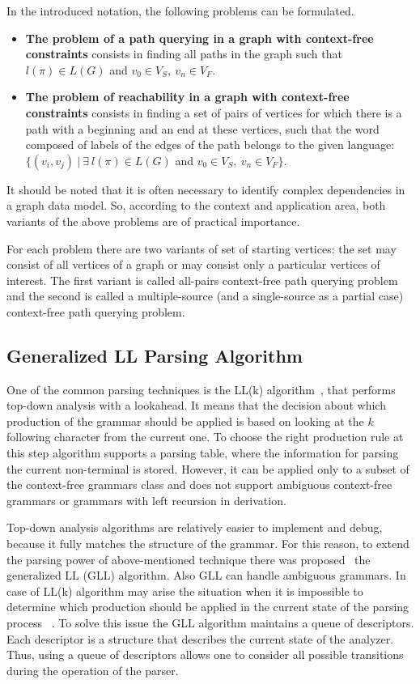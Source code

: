 In the introduced notation, the following problems can be formulated.

\begin{itemize}
     \item \textbf{The problem of a path querying in a graph with context-free constraints} consists in finding all paths in the graph such that $l(\pi) \in L (G)$ and $v_0 \in V_S, ~v_n \in V_F$.
    
     \item \textbf{The problem of reachability in a graph with context-free constraints} consists in finding a set of pairs of vertices for which there is a path with a beginning and an end at these vertices, such that the word composed of labels of the edges of the path  belongs to the given language: $ \{(v_i, v_j) ~ | ~ \exists ~ l (\pi) \in L (G) $ and $ v_0 \in V_S, ~ v_n \in V_F \} $.
\end{itemize}

It should be noted that it is often necessary to identify complex dependencies in a graph data model. So, according to the context and application area, both variants of the above problems are of practical importance. 

For each problem there are two variants of set of starting vertices: the set may consist of all vertices of a graph or may consist only a particular vertices of interest. The first variant is called all-pairs context-free path querying problem and the second is called a multiple-source (and a single-source as a partial case) context-free path querying problem.

\subsection{Generalized LL Parsing Algorithm}
One of the common parsing techniques is the LL(k) algorithm~\cite{10.5555/1076440}, that performs top-down analysis with a lookahead. It means that the decision about which production of the grammar should be applied is based on looking at the $ k $ following character from the current one. To choose the right production rule at this step algorithm supports a parsing table, where the information for parsing the current non-terminal is stored. However, it can be applied only to a subset of the context-free grammars class and does not support ambiguous context-free grammars or grammars with left recursion in derivation.

Top-down analysis algorithms are relatively easier to implement and debug, because it fully matches the structure of the grammar. For this reason, to extend the parsing power of above-mentioned technique there was proposed~\cite{SCOTT2010177} the generalized LL (GLL) algorithm. Also GLL can handle ambiguous grammars.
In case of LL(k) algorithm may arise the situation when it is impossible to determine which production should be applied in the current state of the parsing process ~\cite{10.1145/800105.803402}. To solve this issue the GLL algorithm maintains a queue of descriptors. Each descriptor is a structure that describes the current state of the analyzer. Thus, using a queue of descriptors allows one to consider all possible transitions during the operation of the parser.

